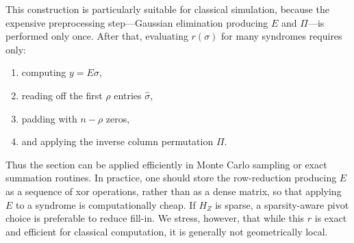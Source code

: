 \documentclass[twoside,english,aps,showpacs,pra,superscriptaddress]{revtex4-2}
\begin{document}
This construction is particularly suitable for classical simulation, because the expensive preprocessing step---Gaussian elimination producing \(E\) and \(\Pi\)---is performed only once. 
After that, evaluating \(r(\sigma)\) for many syndromes requires only:
\begin{enumerate}
    \item computing \(y=E\sigma\),
    \item reading off the first \(\rho\) entries \(\hat \sigma\),
    \item padding with \(n-\rho\) zeros,
    \item and applying the inverse column permutation \(\Pi\).
\end{enumerate}
Thus the section can be applied efficiently in Monte Carlo sampling or exact summation routines. 
In practice, one should store the row-reduction producing \(E\) as a sequence of xor operations, rather than as a dense matrix, so that applying \(E\) to a syndrome is computationally cheap. 
If \(H_Z\) is sparse, a sparsity-aware pivot choice is preferable to reduce fill-in. 
We stress, however, that while this \(r\) is exact and efficient for classical computation, it is generally not geometrically local.

\end{document}
